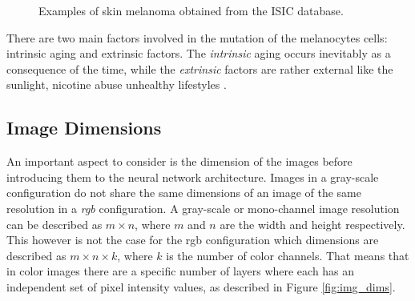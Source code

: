 \begin{figure}[h]
  \centering
  \hspace{-0.4cm}
  \caption{Examples of skin melanoma obtained from the ISIC \citep{isic_skin} database.}
\end{figure}

There are two main factors involved in the mutation of the melanocytes cells: intrinsic aging and extrinsic factors. The \emph{intrinsic} aging occurs inevitably as a consequence of the time, while the \emph{extrinsic} factors are rather external like the sunlight, nicotine abuse unhealthy lifestyles \citep{farage2008intrinsic}.

\subsection{Image Dimensions}
An important aspect to consider is the dimension of the images before introducing them to the neural network architecture. Images in a gray-scale configuration do not share the same dimensions of an image of the same resolution in a \emph{rgb} configuration. A gray-scale or mono-channel image resolution can be described as $m \times n$, where $m$ and $n$ are the width and height respectively. This however is not the case for the rgb configuration which dimensions are described as $m \times n \times k$, where $k$ is the number of color channels. That means that in color images there are a specific number of layers where each has an independent set of pixel intensity values, as described in Figure \ref{fig:img_dims}.


